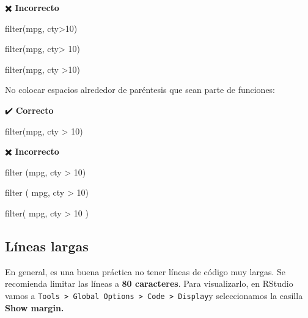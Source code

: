 \documentclass[
  spanish,
  a4paper,
]{scrbook}
\newenvironment{Shaded}{\begin{snugshade}}{\end{snugshade}}
\newcommand{\DecValTok}[1]{\textcolor[rgb]{0.68,0.00,0.00}{#1}}
\newcommand{\FunctionTok}[1]{\textcolor[rgb]{0.28,0.35,0.67}{#1}}
\newcommand{\NormalTok}[1]{\textcolor[rgb]{0.00,0.23,0.31}{#1}}
\newcommand{\SpecialCharTok}[1]{\textcolor[rgb]{0.37,0.37,0.37}{#1}}
\begin{document}
✖️ \textbf{Incorrecto}

\begin{Shaded}
\begin{Highlighting}[]
\FunctionTok{filter}\NormalTok{(mpg, cty}\SpecialCharTok{\textgreater{}}\DecValTok{10}\NormalTok{)}

\FunctionTok{filter}\NormalTok{(mpg, cty}\SpecialCharTok{\textgreater{}} \DecValTok{10}\NormalTok{)}

\FunctionTok{filter}\NormalTok{(mpg, cty }\SpecialCharTok{\textgreater{}}\DecValTok{10}\NormalTok{)}
\end{Highlighting}
\end{Shaded}

No colocar espacios alrededor de paréntesis que sean parte de funciones:

✔️ \textbf{Correcto}

\begin{Shaded}
\begin{Highlighting}[]
\FunctionTok{filter}\NormalTok{(mpg, cty }\SpecialCharTok{\textgreater{}} \DecValTok{10}\NormalTok{)}
\end{Highlighting}
\end{Shaded}

✖️ \textbf{Incorrecto}

\begin{Shaded}
\begin{Highlighting}[]
\FunctionTok{filter}\NormalTok{ (mpg, cty }\SpecialCharTok{\textgreater{}} \DecValTok{10}\NormalTok{)}

\FunctionTok{filter}\NormalTok{ ( mpg, cty }\SpecialCharTok{\textgreater{}} \DecValTok{10}\NormalTok{)}

\FunctionTok{filter}\NormalTok{( mpg, cty }\SpecialCharTok{\textgreater{}} \DecValTok{10}\NormalTok{ )}
\end{Highlighting}
\end{Shaded}

\subsection{Líneas largas}\label{luxedneas-largas}

En general, es una buena práctica no tener líneas de código muy largas.
Se recomienda limitar las líneas a \textbf{80 caracteres}. Para
visualizarlo, en RStudio vamos a
\texttt{Tools\ \textgreater{}\ Global\ Options\ \textgreater{}\ Code\ \textgreater{}\ Display}y
seleccionamos la casilla \textbf{Show margin.}
\end{document}
